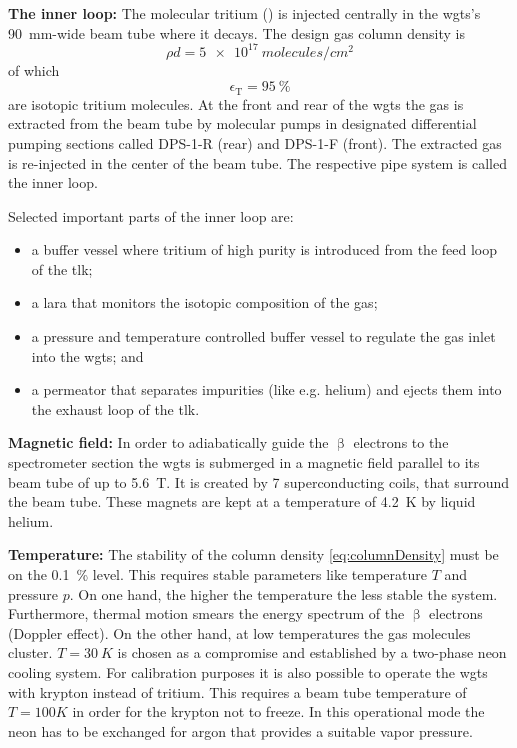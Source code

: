 {\par \textbf{The inner loop:} The molecular tritium () is injected centrally in the \gls{wgts}'s \SI{90}{mm}-wide beam tube where it decays. The design gas column density is 
\begin{equation}
    \label{eq:columnDensity}
    \rho d = \SI{5e17}{molecules/{cm}^2}
\end{equation}
of which \begin{equation}
    \epsilon_\text{T} = \SI{95}{\percent}
\end{equation}
are isotopic tritium molecules. At the front and rear of the \gls{wgts} the gas is extracted from the beam tube by molecular pumps in designated differential pumping sections called DPS-1-R (rear) and DPS-1-F (front). The extracted gas is re-injected in the center of the beam tube. The respective pipe system is called the inner loop.
\begin{samepage}
Selected important parts of the inner loop are:
\begin{itemize}
\renewcommand{\labelitemi}{$\bullet$}
    \item a buffer vessel where tritium of high purity is introduced from the feed loop of the \gls{tlk};
    \item a \gls{lara} that monitors the isotopic composition of the gas;
    \item a pressure and temperature controlled buffer vessel to regulate the gas inlet into the \gls{wgts}; and
    \item a permeator that separates impurities (like e.g. helium) and ejects them into the exhaust loop of the \gls{tlk}.
\end{itemize}
\end{samepage}}


{\par\textbf{Magnetic field:}
In order to adiabatically guide the $\upbeta$ electrons to the spectrometer section the \gls{wgts} is submerged in a magnetic field parallel to its beam tube of up to \SI{5.6}{T}. It is created by 7 superconducting coils, that surround the beam tube. These magnets are kept at a temperature of \SI{4.2}{K} by liquid helium.}

{\par\textbf{Temperature:}
The stability of the column density \eqref{eq:columnDensity} must be on the \SI{0.1}{\percent} level. This requires stable parameters like temperature $T$ and pressure $p$. On one hand, the higher the temperature the less stable the system. Furthermore, thermal motion smears the energy spectrum of the $\upbeta$ electrons (Doppler effect). On the other hand, at low temperatures the gas molecules cluster. $T=\SI{30}{K}$ is chosen as a compromise and established by a two-phase neon cooling system. For calibration purposes it is also possible to operate the \gls{wgts} with krypton instead of tritium. This requires a beam tube temperature of $T=100K$ in order for the krypton not to freeze. In this operational mode the neon has to be exchanged for argon that provides a suitable vapor pressure.}

